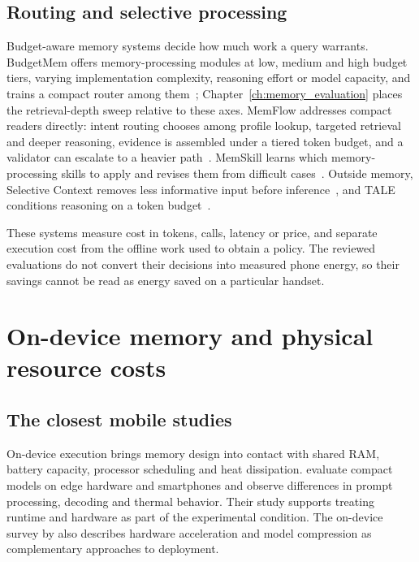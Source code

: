 \subsection{Routing and selective processing}

Budget-aware memory systems decide how much work a query warrants. BudgetMem offers
memory-processing modules at low, medium and high budget tiers, varying implementation
complexity, reasoning effort or model capacity, and trains a compact router among
them~\citep{budgetmem}; Chapter~\ref{ch:memory_evaluation} places the retrieval-depth sweep
relative to these axes. MemFlow addresses compact readers directly: intent routing chooses among
profile lookup, targeted retrieval and deeper reasoning, evidence is assembled under a tiered
token budget, and a validator can escalate to a heavier path~\citep{memflow}. MemSkill learns
which memory-processing skills to apply and revises them from difficult cases~\citep{memskill}.
Outside memory, Selective Context removes less informative input before
inference~\citep{selective_context}, and TALE conditions reasoning on a token
budget~\citep{tale}.

These systems measure cost in tokens, calls, latency or price, and separate execution cost from
the offline work used to obtain a policy. The reviewed evaluations do not convert their decisions
into measured phone energy, so their savings cannot be read as energy saved on a particular
handset.

\section{On-device memory and physical resource costs}
\label{sec:ch2_device}

\subsection{The closest mobile studies}

On-device execution brings memory design into contact with shared RAM, battery capacity,
processor scheduling and heat dissipation. \citet{slm_edge_deployment} evaluate compact
models on edge hardware and smartphones and observe differences in prompt processing,
decoding and thermal behavior. Their study supports treating runtime and hardware as part
of the experimental condition. The on-device survey by \citet{ondevice_lm_review} also
describes hardware acceleration and model compression as complementary approaches to
deployment.

